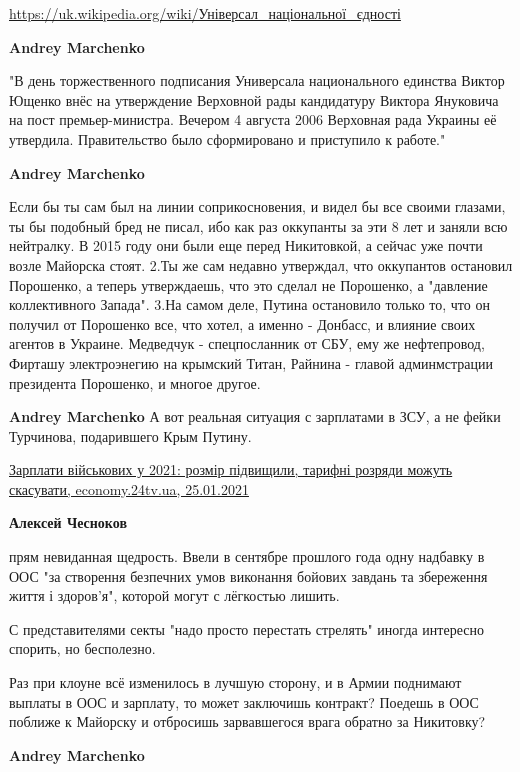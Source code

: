 \begin{itemize}
\begin{itemize}
\url{https://uk.wikipedia.org/wiki/Універсал_національної_єдності}

\textbf{Andrey Marchenko} 

"В день торжественного подписания Универсала национального единства Виктор
Ющенко внёс на утверждение Верховной рады кандидатуру Виктора Януковича на пост
премьер-министра. Вечером 4 августа 2006 Верховная рада Украины её утвердила.
Правительство было сформировано и приступило к работе."


\textbf{Andrey Marchenko} 

Если бы ты сам был на линии соприкосновения, и видел бы все своими глазами, ты
бы подобный бред не писал, ибо как раз оккупанты за эти 8 лет и заняли всю
нейтралку. В 2015 году они были еще перед Никитовкой, а сейчас уже почти возле
Майорска стоят. 2.Ты же сам недавно утверждал, что оккупантов остановил
Порошенко, а теперь утверждаешь, что это сделал не Порошенко, а "давление
коллективного Запада". 3.На самом деле, Путина остановило только то, что он
получил от Порошенко все, что хотел, а именно - Донбасс, и влияние своих
агентов в Украине. Медведчук - спецпосланник от СБУ, ему же нефтепровод,
Фирташу электроэнегию на крымский Титан, Райнина - главой админмстрации
президента Порошенко, и многое другое.

\textbf{Andrey Marchenko} А вот реальная ситуация с зарплатами в ЗСУ, а не фейки Турчинова, подарившего Крым Путину.

\href{https://economy.24tv.ua/zarplata-viyskovih-ukrayina-2021-rozmir-viplat_n1520150}{%
Зарплати військових у 2021: розмір підвищили, тарифні розряди можуть скасувати, %
economy.24tv.ua, 25.01.2021%
}

\textbf{Алексей Чесноков} 

прям невиданная щедрость. Ввели в сентябре прошлого года одну надбавку в ООС
"за створення безпечних умов виконання бойових завдань та збереження життя і
здоров’я", которой могут с лёгкостью лишить.

С представителями секты "надо просто перестать стрелять" иногда интересно
спорить, но бесполезно.

Раз при клоуне всё изменилось в лучшую сторону, и в Армии поднимают выплаты в
ООС и зарплату, то может заключишь контракт? Поедешь в ООС поближе к Майорску и
отбросишь зарвавшегося врага обратно за Никитовку?

\textbf{Andrey Marchenko} 


\end{itemize}
\end{itemize}
